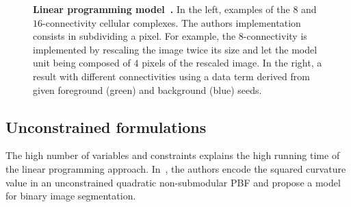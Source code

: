 \begin{figure}
\begin{minipage}{0.25\textwidth}
\end{minipage}%
\begin{minipage}{0.75\textwidth}
\center
{}
\end{minipage}%
\caption{\textbf{Linear programming model~\cite{schoenemann09linear}.} In the left, examples of the $8$ and $16$-connectivity cellular complexes. The authors implementation consists in subdividing a pixel. For example, the $8$-connectivity is implemented by rescaling the image twice its size and let the model unit being composed of $4$ pixels of the rescaled image. In the right, a result with different connectivities using a data term derived from given foreground (green) and background (blue) seeds. }
\end{figure}

\subsection{Unconstrained formulations}

The high number of variables and constraints explains the high running time of the linear programming approach. In~\cite{zehiry10fast}, the authors encode the squared curvature value in an unconstrained quadratic non-submodular PBF and propose a model for binary image segmentation.

